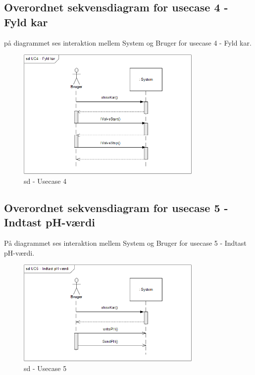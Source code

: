 \subsection*{Overordnet sekvensdiagram for usecase 4 - Fyld kar}
på diagrammet ses interaktion mellem System og Bruger for usecase 4 - Fyld kar.

\begin{figure}[H]
    \centering
    \includegraphics[width=0.8\textwidth]{Systemarkitektur/OverordnedeSekvensdiagrammer/sd_UC4.png}
    \caption{sd - Usecase 4}
    \label{fig:sd_UC4}
\end{figure}

\subsection*{Overordnet sekvensdiagram for usecase 5 - Indtast pH-værdi}
På diagrammet ses interaktion mellem System og Bruger for usecase 5 - Indtast pH-værdi.

\begin{figure}[H]
    \centering
    \includegraphics[width=0.8\textwidth]{Systemarkitektur/OverordnedeSekvensdiagrammer/sd_UC5.png}
    \caption{sd - Usecase 5}
    \label{fig:sd_UC5}
\end{figure}

